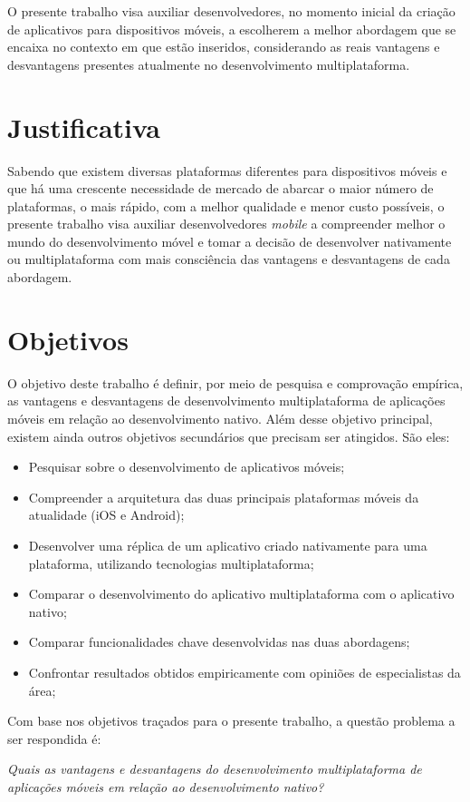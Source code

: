 O presente trabalho visa auxiliar desenvolvedores, no momento inicial da criação de aplicativos 
para dispositivos móveis, a escolherem a melhor abordagem que se encaixa no contexto em que estão inseridos,
considerando as reais vantagens e desvantagens presentes atualmente no desenvolvimento multiplataforma.

\section{Justificativa}\label{sec:justificativa}

Sabendo que existem diversas plataformas diferentes para dispositivos móveis e que há uma crescente 
necessidade de mercado de abarcar o maior número de plataformas, o mais rápido, com a
melhor qualidade e menor custo possíveis, o presente trabalho visa auxiliar desenvolvedores \textit{mobile} 
a compreender melhor o mundo do desenvolvimento móvel e tomar a decisão de 
desenvolver nativamente ou multiplataforma com mais consciência das vantagens e desvantagens de cada abordagem.

\section{Objetivos} \label{sec:objetivos}

O objetivo deste trabalho é definir, por meio de pesquisa e comprovação empírica, as vantagens e desvantagens de desenvolvimento multiplataforma de aplicações móveis em relação ao desenvolvimento nativo. 
Além desse objetivo principal, existem ainda outros objetivos secundários que precisam ser atingidos. São eles: 
\begin{itemize}
    \item Pesquisar sobre o desenvolvimento de aplicativos móveis;
    \item Compreender a arquitetura das duas principais plataformas móveis da atualidade (iOS e Android);
    \item Desenvolver uma réplica de um aplicativo criado nativamente para uma plataforma, utilizando tecnologias multiplataforma;
    \item Comparar o desenvolvimento do aplicativo multiplataforma com o aplicativo nativo;
    \item Comparar funcionalidades chave desenvolvidas nas duas abordagens;
    \item Confrontar resultados obtidos empiricamente com opiniões de especialistas da área;
\end{itemize}
Com base nos objetivos traçados para o presente trabalho, a questão problema a ser respondida é:
\begin{center}
    \textit{Quais as vantagens e desvantagens do desenvolvimento multiplataforma de aplicações móveis em relação ao desenvolvimento nativo?}
\end{center}

